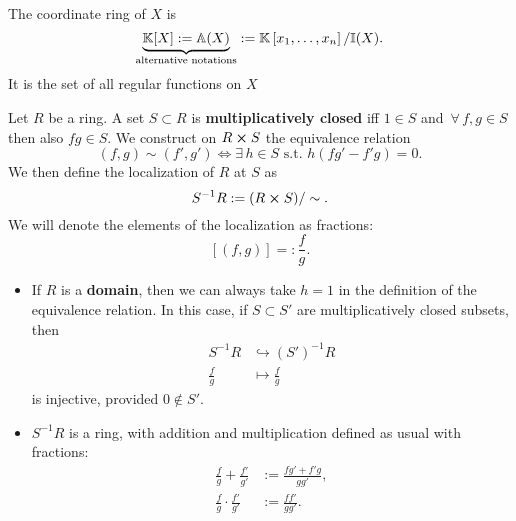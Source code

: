\begin{defn}
	The coordinate ring of $X$ is
	\begin{equation}
		\underbrace{\mathbb{K}[X] := \mathbb{A}(X)}_{\text{alternative notations}} := \mathbb{K}\left[x_1, \ldots, x_n \right]/\mathbb{I}(X)
	.\end{equation} 
	It is the set of all regular functions on $X$
\end{defn}

\begin{constr}[Localization]
	Let $R$ be a ring.
	A set $S \subset R$ is \textbf{multiplicatively closed} iff $1 \in S$ and $\,\forall\, f,g \in S$ then also $fg \in S$.\newline
	We construct on $R \cross S$ the equivalence relation
	\begin{equation}
		\left(f, g\right) \sim \left(f', g'\right) \iff \exists\, h \in S \text{ s.t. } h \left( fg' - f'g \right) = 0
	.\end{equation} 
	We then define the localization of $R$ at $S$ as
	\begin{equation}
	S^{-1} R := (R \cross S)/\sim
	.\end{equation}
	We will denote the elements of the localization as fractions:
	\begin{equation}
	\left[ \left(f, g\right) \right] =: \frac{f}{g}
	.\end{equation} 
\end{constr} 
\begin{rem}\leavevmode\vspace{-.2\baselineskip}
	\begin{itemize}
		\item If $R$ is a \textbf{domain}, then we can always take $h = 1$ in the definition of the equivalence relation.
			In this case, if $S \subset S'$ are multiplicatively closed subsets, then
			\begin{align}
				S^{-1}R &\hookrightarrow (S')^{-1} R\\
				\frac{f}{g} &\mapsto \frac{f}{g}
			\end{align} 	
			is injective, provided $0 \not\in S'$.
		\item $S^{-1} R$ is a ring, with addition and multiplication defined as usual with fractions:
			\begin{align}
				\frac{f}{g} +  \frac{f'}{g'} &:= \frac{fg' + f'g}{gg'},\\
				\frac{f}{g} \cdot \frac{f'}{g'} &:= \frac{ff'}{gg'}
			.\end{align} 
	\end{itemize}
\end{rem}

